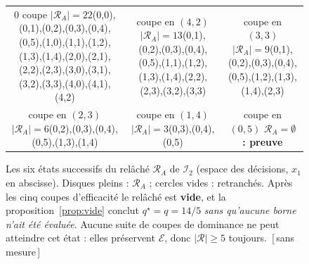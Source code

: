 \documentclass[11pt,a4paper]{article}
\theoremstyle{plain}
\theoremstyle{remark}
\newcommand{\Ecal}{\mathcal{E}}
\newcommand{\Rcal}{\mathcal{R}}
\newcommand{\qs}{q^{\star}}
\newcommand{\confna}{\textsf{\footnotesize[\,sans mesure\,]}}
\begin{document}
\begin{figure}[H]
\centering
\begin{tabular}{@{}c@{\hspace{9mm}}c@{\hspace{9mm}}c@{}}
\panel{$0$ coupe\\$|\Rcal_A|=22$}{(0,0),(0,1),(0,2),(0,3),(0,4),(0,5),(1,0),(1,1),(1,2),(1,3),(1,4),(2,0),(2,1),(2,2),(2,3),(3,0),(3,1),(3,2),(3,3),(4,0),(4,1),(4,2)}
&
\panel{coupe en $(4,2)$\\$|\Rcal_A|=13$}{(0,1),(0,2),(0,3),(0,4),(0,5),(1,1),(1,2),(1,3),(1,4),(2,2),(2,3),(3,2),(3,3)}
&
\panel{coupe en $(3,3)$\\$|\Rcal_A|=9$}{(0,1),(0,2),(0,3),(0,4),(0,5),(1,2),(1,3),(1,4),(2,3)}
\\[7mm]
\panel{coupe en $(2,3)$\\$|\Rcal_A|=6$}{(0,2),(0,3),(0,4),(0,5),(1,3),(1,4)}
&
\panel{coupe en $(1,4)$\\$|\Rcal_A|=3$}{(0,3),(0,4),(0,5)}
&
\panel{coupe en $(0,5)$\\$\Rcal_A=\emptyset$ \textbf{: preuve}}{}
\end{tabular}
\caption{Les six états successifs du relâché $\Rcal_A$ de $\mathcal{I}_2$
(espace des décisions, $x_1$ en abscisse). Disques pleins : $\Rcal_A$ ;
cercles vides : retranchés. Après les cinq coupes d'efficacité le relâché est
\textbf{vide}, et la proposition~\ref{prop:vide} conclut $\qs=q=14/5$
\emph{sans qu'aucune borne n'ait été évaluée}. Aucune suite de coupes de
dominance ne peut atteindre cet état : elles préservent $\Ecal$, donc
$|\Rcal|\ge 5$ toujours.\ \confna}
\label{fig:i2panels}
\end{figure}
\end{document}
